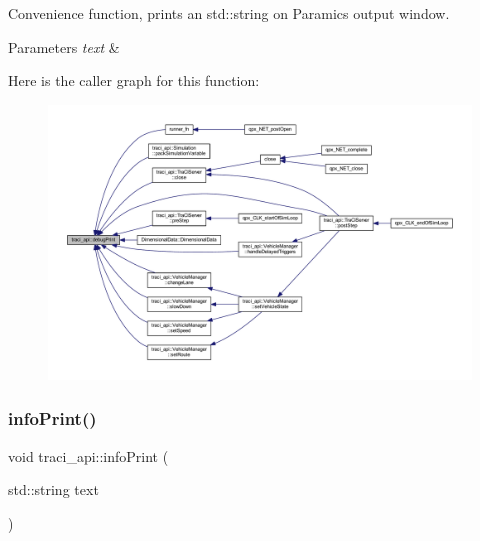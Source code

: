 Convenience function, prints an std\+::string on Paramics\textquotesingle{} output window. 


\begin{DoxyParams}{Parameters}
{\em text} & \\
\hline
\end{DoxyParams}
Here is the caller graph for this function\+:\nopagebreak
\begin{figure}[H]
\begin{center}
\leavevmode
\includegraphics[width=350pt]{namespacetraci__api_a8179b41c12626fc5444d12ee3a6f19cb_icgraph}
\end{center}
\end{figure}
\mbox{\label{namespacetraci__api_a3d103fa606d4762c375bac42c66f62a8}} 
\subsubsection{\texorpdfstring{info\+Print()}{infoPrint()}}
{\footnotesize\ttfamily void traci\+\_\+api\+::info\+Print (\begin{DoxyParamCaption}\item[{std\+::string}]{text }\end{DoxyParamCaption})}

